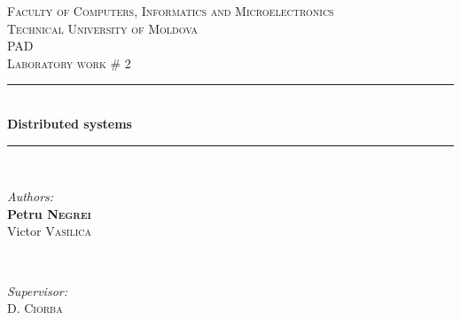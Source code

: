 \documentclass[12pt]{article}
\begin{document}
  \begin{titlepage}

 \newcommand{\HRule}{\rule{\linewidth}{0.5mm}} %
  \begin{center} %

  \textsc{\large Faculty of Computers, Informatics and Microelectronics}\\[0.5cm]
  \textsc{\large Technical University of Moldova}\\[1.2cm] %
  \vspace{35 mm}
  \textsc{\Large PAD}\\[0.5cm] %
  \textsc{\large Laboratory work \# 2}\\[0.5cm] %

  \vspace{10 mm}
  \HRule \\[0.4cm]
  { \LARGE \bfseries Distributed systems  }\\[0.4cm] %
  \HRule \\[1.5cm]

      \vspace{30mm}

      \begin{minipage}{0.4\textwidth}
      \begin{flushleft} \large
      \emph{Authors:}\\
      \textbf{Petru \textsc{Negrei}} \\
      Victor \textsc{Vasilica}
      \end{flushleft}
      \end{minipage}
      ~
      \begin{minipage}{0.4\textwidth}
      \begin{flushright} \large
      \emph{Supervisor:} \\
      D. \textsc{Ciorba} %
      \end{flushright}
      \end{minipage}\\[4cm]


\end{center}
\end{titlepage}
\end{document}
